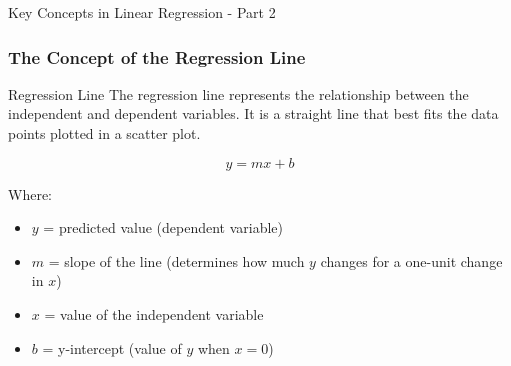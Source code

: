 \documentclass[aspectratio=169]{beamer}
\begin{document}
\begin{frame}[fragile]{Key Concepts in Linear Regression - Part 2}
    \frametitle{The Concept of the Regression Line}
    
    \begin{block}{Regression Line}
        The regression line represents the relationship between the independent and dependent variables. It is a straight line that best fits the data points plotted in a scatter plot.
        
        \begin{equation}
            y = mx + b
        \end{equation}
        
        Where:
        \begin{itemize}
            \item \(y\) = predicted value (dependent variable)
            \item \(m\) = slope of the line (determines how much \(y\) changes for a one-unit change in \(x\))
            \item \(x\) = value of the independent variable
            \item \(b\) = y-intercept (value of \(y\) when \(x = 0\))
        \end{itemize}
    \end{block}
\end{frame}
\end{document}
